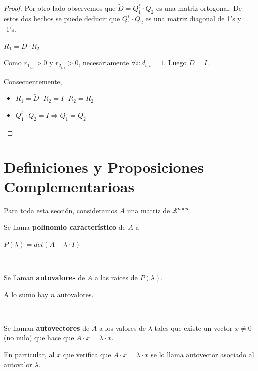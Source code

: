 \documentclass[]{article}
\begin{document}
\begin{prop}
\begin{proof}
		Por otro lado observemos que $\tilde D = Q_1^t\cdot Q_2$ es una matriz ortogonal. De estos dos hechos se puede deducir que $Q_1^t\cdot Q_2$ es una matriz diagonal de 1's y -1's.

		$R_1 = \tilde D \cdot R_2$

		Como $r_{1_{i,i}} > 0$ y $r_{2_{i,i}}>0$, necesariamente $\forall i : d_{i,i}=1$. Luego $\tilde D = I$.

		Consecuentemente,
		\begin{itemize}
			\item $R_1 = \tilde D \cdot R_2 = I \cdot R_2 = R_2$
			\item $Q_1^t\cdot Q_2 = I \Rightarrow Q_1 = Q_2$
		\end{itemize}

	\end{proof}
\end{prop}

\newpage

\section{Definiciones y Proposiciones Complementarioas}
Para toda esta sección, consideramos $A$ una matriz de $\mathbb{R}^{n\times n}$

\begin{defi}
	Se llama \textbf{polinomio característico} de $A$ a
	\begin{center}
		$P(\lambda) = det(A-\lambda\cdot I)$
	\end{center}
\end{defi}
~\newline

\begin{defi}
	Se llaman \textbf{autovalores} de $A$ a las raíces de $P(\lambda)$.

	A lo sumo hay $n$ autovalores.
\end{defi}
~\newline

\begin{defi}
	Se llaman \textbf{autovectores} de $A$ a los valores de $\lambda$ tales que existe un vector $x\neq 0$ (no nulo) que hace que $A\cdot x = \lambda \cdot x$.

	En particular, al $x$ que verifica que $A\cdot x = \lambda \cdot x$ se lo llama autovector asociado al autovalor $\lambda$.
\end{defi}
~\newline
\end{document}
